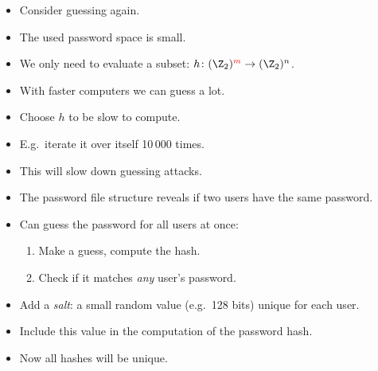 \begin{frame}
  \begin{remark}
    \begin{itemize}
      \item Consider guessing again.
      \item The used password space is small.
      \item We only need to evaluate a subset: \(h\colon 
          (\Z_2)^{\color{red}{m}}\to (\Z_2)^n\).
      \item With faster computers we can guess a lot.
    \end{itemize}
  \end{remark}

  \pause{}

  \begin{solution}
    \begin{itemize}
      \item Choose \(h\) to be slow to compute.
      \item E.g.\ iterate it over itself 10\,000 times.
      \item This will slow down guessing attacks.
    \end{itemize}
  \end{solution}
\end{frame}

\begin{frame}
  \begin{remark}
    \begin{itemize}
      \item The password file structure reveals if two users have the same 
        password.
      \item Can guess the password for all users at once:
        \begin{enumerate}
          \item Make a guess, compute the hash.
          \item Check if it matches \emph{any} user's password.
        \end{enumerate}
    \end{itemize}
  \end{remark}

  \pause{}

  \begin{solution}
    \begin{itemize}
      \item Add a \emph{salt}: a small random value (e.g.\ 128 bits) unique for 
        each user.
      \item Include this value in the computation of the password hash.
      \item Now all hashes will be unique.
    \end{itemize}
  \end{solution}
\end{frame}

